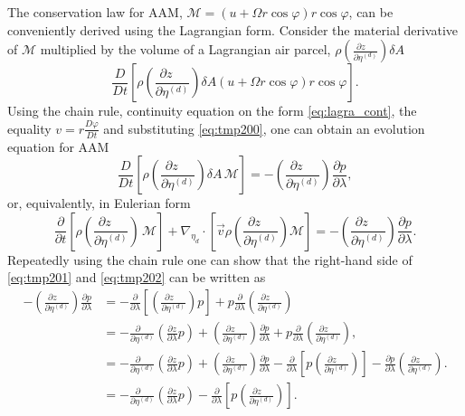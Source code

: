 \documentclass{agujournal}
\begin{document}
The conservation law for AAM, $\mathcal{M}=\left( u+\Omega r \cos \varphi \right) r \cos \varphi$, can be conveniently derived using the Lagrangian form. Consider the material derivative of $\mathcal{M}$ multiplied by the volume of a Lagrangian air parcel, $\rho \left( \frac{\partial z\quad }{\partial \eta^{(d)}}\right)\delta A$
\begin{equation}
\frac{D}{Dt}\left[ \rho \left( \frac{\partial z\quad }{\partial \eta^{(d)}}\right) \delta A \left( u+\Omega r \cos \varphi \right) r \cos \varphi\right].
\end{equation}
Using the chain rule, continuity equation on the form \eqref{eq:lagra_cont}, the equality $v=r\frac{D\varphi}{Dt}$ and substituting \eqref{eq:tmp200}, one can obtain an evolution equation for AAM
\begin{equation}
\frac{D}{Dt}\left[ \rho \left( \frac{\partial z\quad }{\partial \eta^{(d)}}\right) \delta A\, \mathcal{M} \right]=- \left( \frac{\partial z\quad }{\partial \eta^{(d)}}\right) \frac{\partial p}{\partial \lambda},\label{eq:tmp201}
\end{equation}
or, equivalently, in Eulerian form
\begin{equation}
\frac{\partial}{\partial t}\left[ \rho \left( \frac{\partial z\quad }{\partial \eta^{(d)}}\right) \, \mathcal{M} \right]+\nabla_{\eta_d}\cdot \left[\vec{v} \rho \left( \frac{\partial z\quad }{\partial \eta^{(d)}}\right)  \mathcal{M} \right]=- \left( \frac{\partial z\quad }{\partial \eta^{(d)}}\right) \frac{\partial p}{\partial \lambda}.\label{eq:tmp202}
\end{equation}
Repeatedly using the chain rule one can show that the right-hand side of \eqref{eq:tmp201} and \eqref{eq:tmp202} can be written as
\begin{align}
- \left( \frac{\partial z\quad }{\partial \eta^{(d)}}\right)\frac{\partial p}{\partial \lambda}&=-\frac{\partial }{\partial \lambda}\left[  \left( \frac{\partial z\quad }{\partial \eta^{(d)}}\right) p\right]+p\frac{\partial }{\partial \lambda} \left( \frac{\partial z\quad }{\partial \eta^{(d)}}\right)\\ 
&=-\frac{\partial \quad}{\partial \eta^{(d)}}\left( \frac{\partial z}{\partial \lambda}p\right)+\left( \frac{\partial z\quad }{\partial \eta^{(d)}}\right)\frac{\partial p}{\partial \lambda}+p\frac{\partial }{\partial \lambda}\left( \frac{\partial z\quad }{\partial \eta^{(d)}}\right),\\
&=-\frac{\partial \quad}{\partial \eta^{(d)}}\left( \frac{\partial z}{\partial \lambda}p\right)+\left( \frac{\partial z\quad }{\partial \eta^{(d)}}\right)\frac{\partial p}{\partial \lambda}-\frac{\partial }{\partial \lambda}\left[ p\left( \frac{\partial z\quad }{\partial \eta^{(d)}}\right)\right]-\frac{\partial p}{\partial \lambda}\left( \frac{\partial z\quad }{\partial \eta^{(d)}}\right).\\
&=-\frac{\partial \quad}{\partial \eta^{(d)}}\left( \frac{\partial z}{\partial \lambda}p\right)-\frac{\partial }{\partial \lambda}\left[ p\left( \frac{\partial z\quad }{\partial \eta^{(d)}}\right)\right].\label{eq:tmp203}
\end{align}
\end{document}
